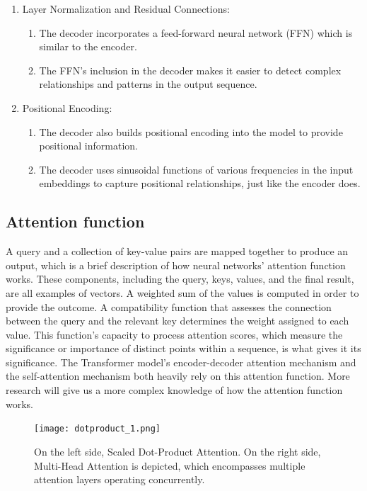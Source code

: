 \begin{enumerate}
\begin{enumerate}
    \end{enumerate}

    \item Layer Normalization and Residual Connections:
    \begin{enumerate}
       \item The decoder incorporates a feed-forward neural network (FFN) which is similar to the encoder.
        \item The FFN's inclusion in the decoder makes it easier to detect complex relationships and patterns in the output sequence.

    \end{enumerate}

    \item Positional Encoding:
    \begin{enumerate}
       \item The decoder also builds positional encoding into the model to provide positional information.
        \item The decoder uses sinusoidal functions of various frequencies in the input embeddings to capture positional relationships, just like the encoder does.

    \end{enumerate}
\end{enumerate}

\subsection{Attention function}
A query and a collection of key-value pairs are mapped together to produce an output, which is a brief description of how neural networks' attention function works. These components, including the query, keys, values, and the final result, are all examples of vectors. A weighted sum of the values is computed in order to provide the outcome. A compatibility function that assesses the connection between the query and the relevant key determines the weight assigned to each value. This function's capacity to process attention scores, which measure the significance or importance of distinct points within a sequence, is what gives it its significance. The Transformer model's encoder-decoder attention mechanism and the self-attention mechanism both heavily rely on this attention function. More research will give us a more complex knowledge of how the attention function works.

\begin{figure}[!h]
    \centering
    \texttt{[image: dotproduct\_1.png]}
    \label{fig:dotprod}
    \caption{On the left side, Scaled Dot-Product Attention. On the right side, Multi-Head Attention is depicted, which encompasses multiple attention layers operating concurrently.\cite{attention}}
\end{figure}

